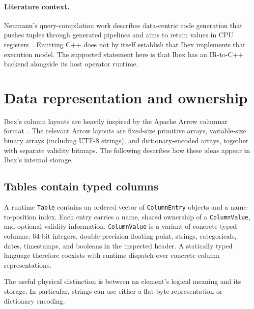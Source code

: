 \documentclass[11pt,a4paper]{article}
\newcommand{\code}[1]{\nolinkurl{#1}}
\begin{document}
\paragraph{Literature context.}
Neumann's query-compilation work describes data-centric code generation that
pushes tuples through generated pipelines and aims to retain values in CPU
registers~\cite{neumann2011}. Emitting C++ does not by itself establish that
Ibex implements that execution model. The supported statement here is that
Ibex has an IR-to-C++ backend alongside its host operator runtime.

\section{Data representation and ownership}
Ibex's column layouts are heavily inspired by the Apache Arrow columnar
format~\cite{arrowColumnar}. The relevant Arrow layouts are fixed-size
primitive arrays, variable-size binary arrays (including UTF-8 strings),
and dictionary-encoded arrays, together with separate validity bitmaps.
The following describes how these ideas appear in Ibex's internal storage.

\subsection{Tables contain typed columns}
A runtime \code{Table} contains an ordered vector of \code{ColumnEntry}
objects and a name-to-position index. Each entry carries a name, shared
ownership of a \code{ColumnValue}, and optional validity information.
\code{ColumnValue} is a variant of concrete typed columns: 64-bit integers,
double-precision floating point, strings, categoricals, dates, timestamps,
and booleans in the inspected header. A statically typed language therefore
coexists with runtime dispatch over concrete column representations.

The useful physical distinction is between an element's logical meaning and
its storage. In particular, strings can use either a flat byte representation
or dictionary encoding.
\end{document}
